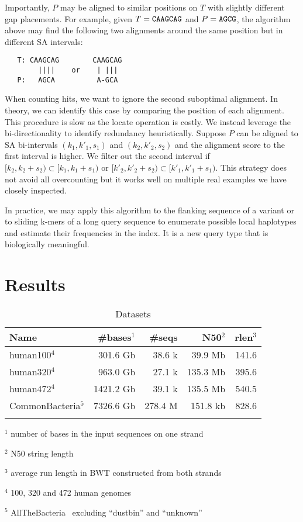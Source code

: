 \documentclass[webpdf,contemporary,large,namedate]{oup-authoring-template}%
\begin{document}
Importantly, $P$ may be aligned to similar positions on $T$ with slightly different gap placements.
For example, given $T={\tt CAAGCAG}$ and $P={\tt AGCG}$,
the algorithm above may find the following two alignments around the same position but in different SA intervals:
\begin{verbatim}
   T: CAAGCAG        CAAGCAG
        ||||    or    | |||
   P:   AGCA          A-GCA
\end{verbatim}
When counting hits, we want to ignore the second suboptimal alignment.
In theory, we can identify this case by comparing the position of each alignment.
This procedure is slow as the locate operation is costly.
We instead leverage the bi-directionality to identify redundancy heuristically.
Suppose $P$ can be aligned to SA bi-intervals $(k_1,k'_1,s_1)$ and $(k_2,k'_2,s_2)$ and the alignment score to the first interval is higher.
We filter out the second interval if $[k_2,k_2+s_2)\subset[k_1,k_1+s_1)$ or $[k'_2,k'_2+s_2)\subset[k'_1,k'_1+s_1)$.
This strategy does not avoid all overcounting but it works well on multiple real examples we have closely inspected.

In practice, we may apply this algorithm to the flanking sequence of a variant
or to sliding k-mers of a long query sequence to enumerate possible local haplotypes and estimate their frequencies in the index.
It is a new query type that is biologically meaningful.

\section{Results}

\begin{table}[!tb]
\caption{Datasets\label{tab:data}}
\begin{tabular*}{\columnwidth}{@{\extracolsep\fill}lrrrr@{\extracolsep\fill}}
\toprule
Name               & \#bases$^1$ & \#seqs & N50$^2$  & rlen$^3$ \\
\midrule
human100$^4$       &  301.6 Gb &  38.6 k  & 39.9  Mb & 141.6 \\
human320$^4$       &  963.0 Gb &  27.1 k  & 135.3 Mb & 395.6 \\
human472$^4$       & 1421.2 Gb &  39.1 k  & 135.5 Mb & 540.5 \\
CommonBacteria$^5$ & 7326.6 Gb & 278.4 M  & 151.8 kb & 828.6 \\
\botrule
\end{tabular*}
\begin{tablenotes}\setlength\itemsep{0.0em}
\item[$^{1}$] number of bases in the input sequences on one strand
\item[$^{2}$] N50 string length
\item[$^{3}$] average run length in BWT constructed from both strands
\item[$^{4}$] 100, 320 and 472 human genomes
\item[$^{5}$] AllTheBacteria~\citep{Hunt2024.03.08.584059} excluding ``dustbin'' and ``unknown''
\end{tablenotes}
\end{table}
\end{document}
